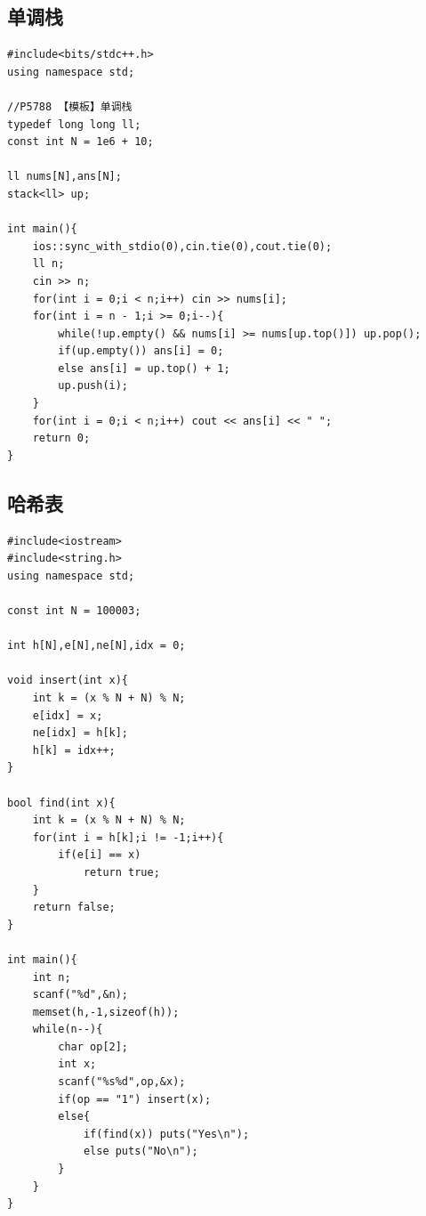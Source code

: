 \documentclass[10pt,a4paper]{article}
\begin{document}
\subsection{单调栈}
\begin{lstlisting}[caption={}]
#include<bits/stdc++.h>
using namespace std;

//P5788 【模板】单调栈
typedef long long ll;
const int N = 1e6 + 10;

ll nums[N],ans[N];
stack<ll> up;

int main(){
	ios::sync_with_stdio(0),cin.tie(0),cout.tie(0);
	ll n;
	cin >> n;
	for(int i = 0;i < n;i++) cin >> nums[i];
	for(int i = n - 1;i >= 0;i--){
		while(!up.empty() && nums[i] >= nums[up.top()]) up.pop();
		if(up.empty()) ans[i] = 0;
		else ans[i] = up.top() + 1;
		up.push(i);
	}
	for(int i = 0;i < n;i++) cout << ans[i] << " ";
	return 0;
}
\end{lstlisting}


\subsection{哈希表}
\begin{lstlisting}[caption={}]
#include<iostream>
#include<string.h>
using namespace std;

const int N = 100003;

int h[N],e[N],ne[N],idx = 0;

void insert(int x){
	int k = (x % N + N) % N;
	e[idx] = x;
	ne[idx] = h[k];
	h[k] = idx++;
}

bool find(int x){
	int k = (x % N + N) % N;
	for(int i = h[k];i != -1;i++){
		if(e[i] == x)
			return true;
	}
	return false;
}

int main(){
	int n;
	scanf("%d",&n);
	memset(h,-1,sizeof(h));
	while(n--){
		char op[2];
		int x;
		scanf("%s%d",op,&x);
		if(op == "1") insert(x);
		else{
			if(find(x)) puts("Yes\n");
			else puts("No\n");
		}
	}
}
\end{lstlisting}
\end{document}
